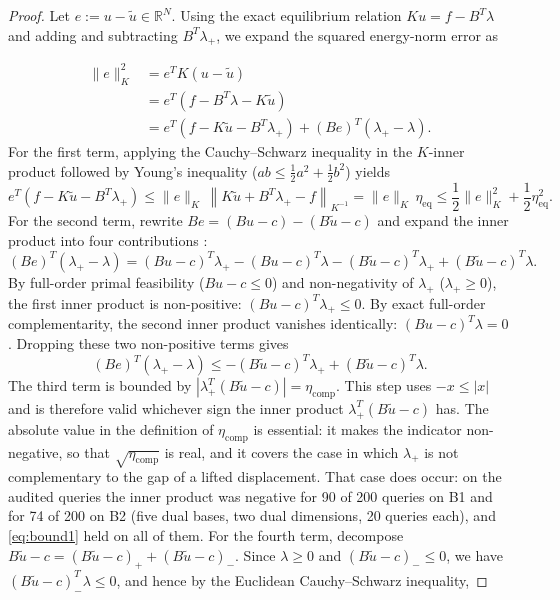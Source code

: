 \documentclass[11pt,a4paper]{article}
\begin{document}
\begin{proof}

Let \(e := u - \tilde{u} \in \mathbb{R}^N\). Using the exact equilibrium relation \(K u = f - B^T \lambda\) and adding and subtracting \(B^T \lambda_+\), we expand the squared energy-norm error as \cite{hild2007residual, banz2024generic}

\[
\begin{aligned}
\|e\|_K^2 &= e^T K (u - \tilde{u}) \\
&= e^T \left( f - B^T \lambda - K \tilde{u} \right) \\
&= e^T \left( f - K \tilde{u} - B^T \lambda_+ \right) + (B e)^T (\lambda_+ - \lambda).
\end{aligned}
\]
For the first term, applying the Cauchy--Schwarz inequality in the \(K\)-inner product followed by Young's inequality (\(a b \le \frac{1}{2} a^2 + \frac{1}{2} b^2\)) yields
\[
e^T \left( f - K \tilde{u} - B^T \lambda_+ \right) \le \|e\|_K \, \left\| K \tilde{u} + B^T \lambda_+ - f \right\|_{K^{-1}} = \|e\|_K \, \eta_{\mathrm{eq}} \le \frac{1}{2} \|e\|_K^2 + \frac{1}{2} \eta_{\mathrm{eq}}^2.
\]
For the second term, rewrite \(B e = (B u - c) - (B \tilde{u} - c)\) and expand the inner product into four contributions \cite{hild2007residual, banz2026posteriori}:
\[
(B e)^T (\lambda_+ - \lambda) = (B u - c)^T \lambda_+ - (B u - c)^T \lambda - (B \tilde{u} - c)^T \lambda_+ + (B \tilde{u} - c)^T \lambda.
\]
By full-order primal feasibility (\(B u - c \le 0\)) and non-negativity of \(\lambda_+\) (\(\lambda_+ \ge 0\)), the first inner product is non-positive: \((B u - c)^T \lambda_+ \le 0\). By exact full-order complementarity, the second inner product vanishes identically: \((B u - c)^T \lambda = 0\). Dropping these two non-positive terms gives
\[
(B e)^T (\lambda_+ - \lambda) \le -(B \tilde{u} - c)^T \lambda_+ + (B \tilde{u} - c)^T \lambda.
\]
The third term is bounded by \(\left| \lambda_+^T (B \tilde{u} - c) \right| = \eta_{\mathrm{comp}}\). This step uses \(-x \le |x|\) and is therefore valid whichever sign the inner product \(\lambda_+^T (B \tilde{u} - c)\) has. The absolute value in the definition of \(\eta_{\mathrm{comp}}\) is essential: it makes the indicator non-negative, so that \(\sqrt{\eta_{\mathrm{comp}}}\) is real, and it covers the case in which \(\lambda_+\) is not complementary to the gap of a lifted displacement. That case does occur: on the audited queries the inner product was negative for 90 of 200 queries on B1 and for 74 of 200 on B2 (five dual bases, two dual dimensions, 20 queries each), and \eqref{eq:bound1} held on all of them. For the fourth term, decompose \(B \tilde{u} - c = (B \tilde{u} - c)_+ + (B \tilde{u} - c)_-\). Since \(\lambda \ge 0\) and \((B \tilde{u} - c)_- \le 0\), we have \((B \tilde{u} - c)_-^T \lambda \le 0\), and hence by the Euclidean Cauchy--Schwarz inequality,

\end{proof}
\end{document}
